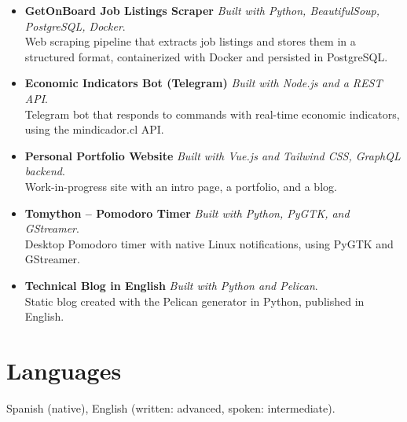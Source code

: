 \documentclass[11pt,a4paper]{article}
\begin{document}
\begin{itemize}[leftmargin=*, noitemsep, topsep=2pt]
    \item \textbf{GetOnBoard Job Listings Scraper} \textit{Built with Python, BeautifulSoup, PostgreSQL, Docker}.\\
    Web scraping pipeline that extracts job listings and stores them in a structured format, containerized with Docker and persisted in PostgreSQL.
    
    \item \textbf{Economic Indicators Bot (Telegram)} \textit{Built with Node.js and a REST API}.\\
    Telegram bot that responds to commands with real-time economic indicators, using the mindicador.cl API.
    \item \textbf{Personal Portfolio Website} \textit{Built with Vue.js and Tailwind CSS, GraphQL backend}.\\
    Work-in-progress site with an intro page, a portfolio, and a blog.

    \item \textbf{Tomython -- Pomodoro Timer} \textit{Built with Python, PyGTK, and GStreamer}.\\
    Desktop Pomodoro timer with native Linux notifications, using PyGTK and GStreamer.
    
    \item \textbf{Technical Blog in English} \textit{Built with Python and Pelican}.\\
    Static blog created with the Pelican generator in Python, published in English.

\end{itemize}

\section*{Languages}
Spanish (native), English (written: advanced, spoken: intermediate).
\end{document}
